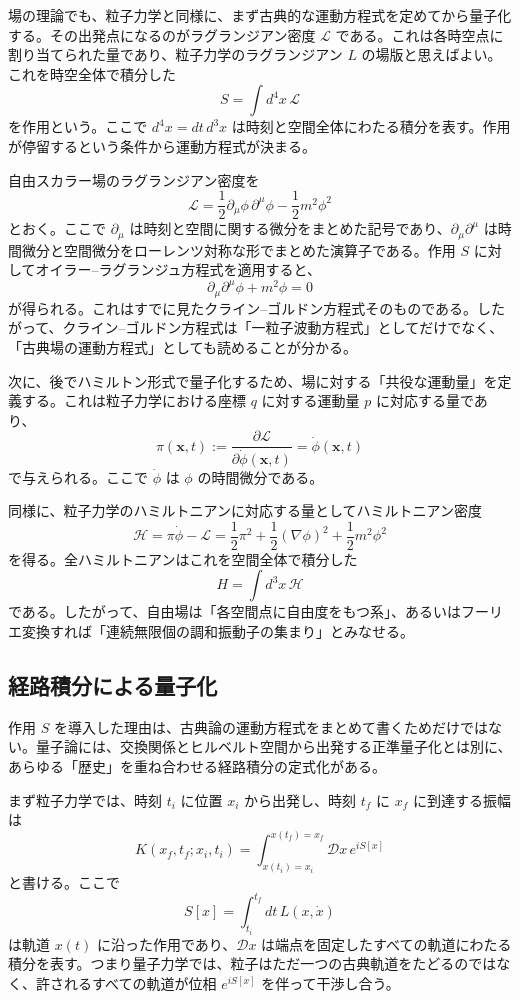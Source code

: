 場の理論でも、粒子力学と同様に、まず古典的な運動方程式を定めてから量子化する。その出発点になるのがラグランジアン密度 $\mathcal{L}$ である。これは各時空点に割り当てられた量であり、粒子力学のラグランジアン $L$ の場版と思えばよい。これを時空全体で積分した
\[
S = \int d^4x\, \mathcal{L}
\]
を作用という。ここで $d^4x = dt\,d^3x$ は時刻と空間全体にわたる積分を表す。作用が停留するという条件から運動方程式が決まる。

自由スカラー場のラグランジアン密度を
\[
\mathcal{L} = \frac{1}{2}\partial_\mu \phi \, \partial^\mu \phi - \frac{1}{2}m^2\phi^2
\]
とおく。ここで $\partial_\mu$ は時刻と空間に関する微分をまとめた記号であり、$\partial_\mu \partial^\mu$ は時間微分と空間微分をローレンツ対称な形でまとめた演算子である。作用 $S$ に対してオイラー--ラグランジュ方程式を適用すると、
\[
\partial_\mu \partial^\mu \phi + m^2 \phi = 0
\]
が得られる。これはすでに見たクライン--ゴルドン方程式そのものである。したがって、クライン--ゴルドン方程式は「一粒子波動方程式」としてだけでなく、「古典場の運動方程式」としても読めることが分かる。

次に、後でハミルトン形式で量子化するため、場に対する「共役な運動量」を定義する。これは粒子力学における座標 $q$ に対する運動量 $p$ に対応する量であり、
\[
\pi(\mathbf{x},t) := \frac{\partial \mathcal{L}}{\partial \dot{\phi}(\mathbf{x},t)} = \dot{\phi}(\mathbf{x},t)
\]
で与えられる。ここで $\dot{\phi}$ は $\phi$ の時間微分である。

同様に、粒子力学のハミルトニアンに対応する量としてハミルトニアン密度
\[
\mathcal{H} = \pi \dot{\phi} - \mathcal{L}
= \frac{1}{2}\pi^2 + \frac{1}{2}(\nabla \phi)^2 + \frac{1}{2}m^2\phi^2
\]
を得る。全ハミルトニアンはこれを空間全体で積分した
\[
H = \int d^3x\, \mathcal{H}
\]
である。したがって、自由場は「各空間点に自由度をもつ系」、あるいはフーリエ変換すれば「連続無限個の調和振動子の集まり」とみなせる。

\subsection{経路積分による量子化}
作用 $S$ を導入した理由は、古典論の運動方程式をまとめて書くためだけではない。量子論には、交換関係とヒルベルト空間から出発する正準量子化とは別に、あらゆる「歴史」を重ね合わせる経路積分の定式化がある。

まず粒子力学では、時刻 $t_i$ に位置 $x_i$ から出発し、時刻 $t_f$ に $x_f$ に到達する振幅は
\[
K(x_f,t_f;x_i,t_i)
=
\int_{x(t_i)=x_i}^{x(t_f)=x_f} \mathcal{D}x \, e^{iS[x]}
\]
と書ける。ここで
\[
S[x]=\int_{t_i}^{t_f} dt\, L(x,\dot{x})
\]
は軌道 $x(t)$ に沿った作用であり、$\mathcal{D}x$ は端点を固定したすべての軌道にわたる積分を表す。つまり量子力学では、粒子はただ一つの古典軌道をたどるのではなく、許されるすべての軌道が位相 $e^{iS[x]}$ を伴って干渉し合う。

